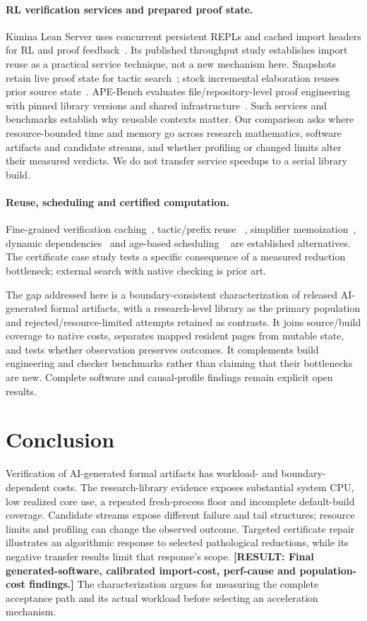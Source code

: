 \documentclass[10pt,twocolumn]{article}
\newcommand{\missing}[1]{\textbf{[RESULT: #1]}}
\begin{document}
\paragraph{RL verification services and prepared proof state.}
Kimina Lean Server uses concurrent persistent REPLs and cached import headers
for RL and proof feedback~\cite{kimina,kiminaPaper}.
Its published throughput study establishes import reuse as a practical
service technique, not a new mechanism here.
Snapshots retain live proof state for tactic search~\cite{leanSnapshot};
stock incremental elaboration reuses prior source state~\cite{leanIncremental}.
APE-Bench evaluates file/repository-level proof engineering with pinned
library versions and shared infrastructure~\cite{apeBench2026}.
Such services and benchmarks establish why reusable contexts matter.
Our comparison asks where resource-bounded time and memory go across
research mathematics, software artifacts and candidate streams, and whether
profiling or changed limits alter their measured verdicts.
We do not transfer service speedups to a serial library build.

\paragraph{Reuse, scheduling and certified computation.}
Fine-grained verification caching~\cite{boogieCache}, tactic/prefix reuse
~\cite{tactician2020,shred}, simplifier memoization~\cite{leanSimpCache},
dynamic dependencies~\cite{salsaDependencies,adapton} and age-based scheduling
~\cite{lubyRestart1993,soap2018} are established alternatives.
The certificate case study tests a specific consequence of a measured
reduction bottleneck; external search with native checking is prior art.

The gap addressed here is a boundary-consistent characterization of released
AI-generated formal artifacts, with a research-level library as the primary
population and rejected/resource-limited attempts retained as contrasts.
It joins source/build coverage to native costs, separates mapped resident
pages from mutable state, and tests whether observation preserves outcomes.
It complements build engineering and checker benchmarks rather than claiming
that their bottlenecks are new. Complete software and causal-profile
findings remain explicit open results.
\section{Conclusion}
Verification of AI-generated formal artifacts has workload- and
boundary-dependent costs.
The research-library evidence exposes substantial system CPU, low realized
core use, a repeated fresh-process floor and incomplete default-build
coverage. Candidate streams expose different failure and tail structures;
resource limits and profiling can change the observed outcome.
Targeted certificate repair illustrates an algorithmic response to selected
pathological reductions, while its negative transfer results limit that
response's scope.
\missing{Final generated-software, calibrated import-cost, perf-cause and
population-cost findings.}
The characterization argues for measuring the complete acceptance path and
its actual workload before selecting an acceleration mechanism.



\end{document}
